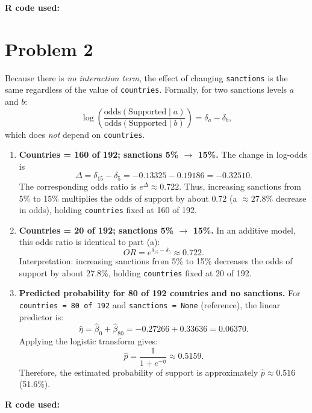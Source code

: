 \documentclass[12pt,letterpaper]{article}
\begin{document}
\newpage

\noindent\textbf{R code used:}





\section*{Problem 2}

\noindent Because there is \emph{no interaction term}, the effect of changing \texttt{sanctions} is the same regardless of the value of \texttt{countries}. Formally, for two sanctions levels $a$ and $b$:
\[
\log\!\left(\frac{\text{odds}(\text{Supported}\mid a)}{\text{odds}(\text{Supported}\mid b)}\right)
= \delta_{a}-\delta_{b},
\]
which does \textit{not} depend on \texttt{countries}.

\begin{enumerate}
	\item[(a)] \textbf{Countries = 160 of 192; sanctions 5\% $\to$ 15\%.} The change in log-odds is
	\[
	\Delta = \delta_{15}-\delta_{5} = -0.13325 - 0.19186 = -0.32510.
	\]
	The corresponding odds ratio is $e^{\Delta} \approx 0.722$. Thus, increasing sanctions from 5\% to 15\% multiplies the odds of support by about $0.72$ (a \(\approx 27.8\%\) decrease in odds), holding \texttt{countries} fixed at 160 of 192.
	
	\item[(b)] \textbf{Countries = 20 of 192; sanctions 5\% $\to$ 15\%.} In an additive model, this odds ratio is identical to part (a):
	\[
	OR = e^{\delta_{15}-\delta_{5}} \approx 0.722.
	\]
	Interpretation: increasing sanctions from 5\% to 15\% decreases the odds of support by about 27.8\%, holding \texttt{countries} fixed at 20 of 192.
	
	\item[(c)] \textbf{Predicted probability for 80 of 192 countries and no sanctions.} For \texttt{countries = 80 of 192} and \texttt{sanctions = None} (reference), the linear predictor is:
	\[
	\hat{\eta} = \hat{\beta}_0 + \hat{\beta}_{80} = -0.27266 + 0.33636 = 0.06370.
	\]
	Applying the logistic transform gives:
	\[
	\hat{p} = \frac{1}{1+e^{-\hat{\eta}}} \approx 0.5159.
	\]
	Therefore, the estimated probability of support is approximately \(\hat{p}\approx 0.516\) (51.6\%).
\end{enumerate}

\noindent\textbf{R code used:}


\end{document}
